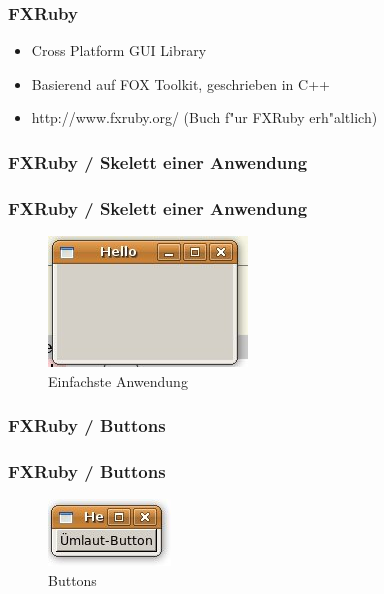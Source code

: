 \documentclass{beamer}
\begin{document}
\lstset{language=Ruby}
\lstset{basicstyle=\small,numbers=none, numberstyle=\tiny, numbersep=5pt}
\begin{frame}
  \frametitle{FXRuby}
  \begin{itemize}
    \item Cross Platform GUI Library
    \item Basierend auf FOX Toolkit, geschrieben in C++
    \item http://www.fxruby.org/ (Buch f"ur FXRuby erh"altlich)
  \end{itemize}
\end{frame}

\begin{frame}
  \frametitle{FXRuby / Skelett einer Anwendung}
  
\end{frame}

\begin{frame}
  \frametitle{FXRuby / Skelett einer Anwendung}
  \begin{figure}
    \includegraphics[scale=1.0]{code/beispiel1.jpg} 
    \caption{Einfachste Anwendung}
  \end{figure}
\end{frame}

\begin{frame}
  \frametitle{FXRuby / Buttons}
  
\end{frame}

\begin{frame}
  \frametitle{FXRuby / Buttons}
  \begin{figure}
    \includegraphics[scale=1.0]{code/beispiel2.jpg} 
    \caption{Buttons}
  \end{figure}
\end{frame}
\end{document}
